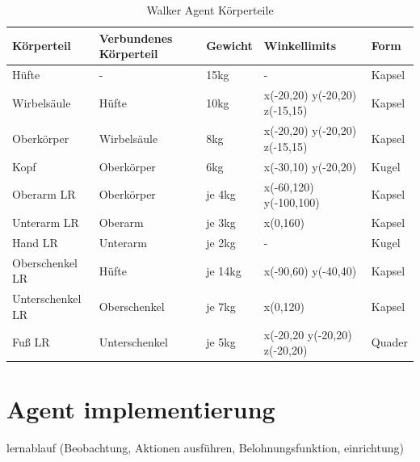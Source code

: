 \begin{table}
  \centering
  {
  \begin{tabular}{ |p{3cm}|p{3cm}|p{2cm}|p{4cm}|p{2cm}| }
  \hline
  Körperteil& Verbundenes Körperteil & Gewicht & Winkellimits & Form \\
  \hline
  Hüfte & - & 15kg & - & Kapsel \\
  Wirbelsäule & Hüfte & 10kg & x(-20,20) y(-20,20) z(-15,15) & Kapsel \\
  Oberkörper & Wirbelsäule & 8kg & x(-20,20) y(-20,20) z(-15,15) & Kapsel \\
  Kopf & Oberkörper & 6kg & x(-30,10) y(-20,20) & Kugel \\
  Oberarm LR & Oberkörper & je 4kg & x(-60,120) y(-100,100) & Kapsel \\
  Unterarm LR & Oberarm & je 3kg & x(0,160) & Kapsel \\
  Hand LR & Unterarm & je 2kg & - & Kugel \\
  Oberschenkel LR & Hüfte & je 14kg& x(-90,60) y(-40,40) & Kapsel \\
  Unterschenkel LR & Oberschenkel & je 7kg &  x(0,120) & Kapsel \\
  Fuß LR & Unterschenkel & je 5kg & x(-20,20 y(-20,20) z(-20,20) & Quader \\
  \hline
  \end{tabular}}
  \caption{Walker Agent Körperteile}
  \label{table:walker_körperteile}
\end{table}

\section{Agent implementierung}
lernablauf (Beobachtung, Aktionen ausführen, Belohnungsfunktion, einrichtung)

